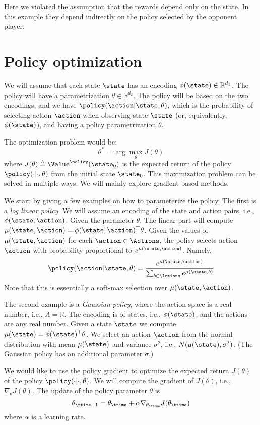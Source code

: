 Here we violated the assumption that the rewards depend only on the
state. In this example they depend indirectly on the policy selected by the opponent player.

\section{Policy optimization}

We will assume that each state $\state$ has an encoding
$\phi(\state)\in \mathbb{R}^{d_1}$. The policy will have a
parametrization $\theta\in \mathbb{R}^{d_2}$. The policy will be
based on the two encodings, and we have
$\policy(\action|\state,\theta)$, which is the probability of
selecting action $\action$ when observing state $\state$ (or,
equivalently, $\phi(\state)$), and having a policy parametrization
$\theta$.

The optimization problem would be:
\[
\theta^* = \arg\max_\theta J(\theta)
\]
where $J(\theta) \triangleq \Value^\policy(\state_0)$ is the
expected return of the policy $\policy(\cdot|\cdot,\theta)$ from the
initial state $\state_0$.
%
This maximization problem can be solved in multiple ways. We will
mainly explore gradient based methods.

We start by giving a few examples on how to parameterize the policy.
The first is a {\em log linear policy}. We will assume an encoding
of the state and action pairs, i.e., $\phi(\state,\action)$. Given the parameter $\theta$, The linear part will compute $\mu(\state,\action)=\phi(\state,\action)^\top \theta$. Given the values of $\mu(\state,\action)$ for each $\action\in \Actions$, the policy selects action $\action$ with probability proportional to
$e^{\mu(\state,\action)}$. Namely,
\[
\policy(\action|\state,\theta)=
\frac{e^{\mu(\state,\action)}}{\sum_{b\in
\Actions}e^{\mu(\state,b)}}
\]
Note that this is essentially a soft-max selection over $\mu(\state,\action)$.

The second example is a {\em Gaussian policy}, where the action
space is a real number, i.e., $A=\mathbb{R}$. The encoding is of states, i.e., $\phi(\state)$, and the actions are any real number. Given a state $\state$
we compute $\mu(\state)=\phi(\state)^\top\theta$. We select an
action $\action$ from the normal distribution with mean
$\mu(\state)$ and variance $\sigma^2$, i.e.,
$N(\mu(\state),\sigma^2)$. (The Gaussian policy has an additional
parameter $\sigma$.)

We would like to use the policy gradient to optimize the expected
return  $J(\theta)$ of the policy $\policy(\cdot|\cdot,\theta)$. We
will compute the gradient of $J(\theta)$, i.e., $\nabla_\theta
J(\theta)$. The update of the policy parameter $\theta$ is
\[
\theta_{\ttime+1}=\theta_\ttime + \alpha \nabla_{\theta_\ttime}
J(\theta_\ttime)
\]
where $\alpha$ is a learning rate.

